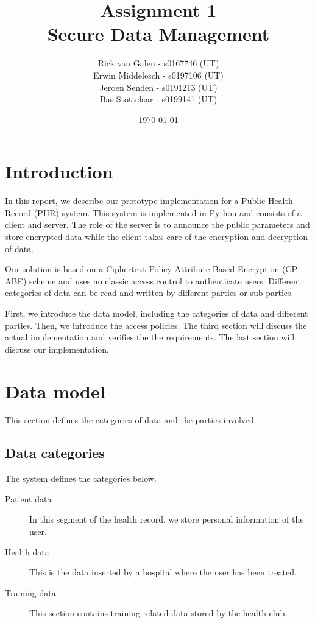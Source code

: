 \documentclass[a4paper]{article}
\begin{document}
\title{Assignment 1 \\ Secure Data Management}
\author{Rick van Galen - s0167746 (UT) \\ Erwin Middelesch - s0197106 (UT) \\ Jeroen Senden - s0191213 (UT) \\ Bas Stottelaar - s0199141 (UT)}
\date{\today}
\maketitle

\section{Introduction}
	In this report, we describe our prototype implementation for a Public Health Record (PHR) system. This system is implemented in Python and consists of a client and server. The role of the server is to announce the public parameters and store encrypted data while the client takes care of the encryption and decryption of data.

	Our solution is based on a Ciphertext-Policy Attribute-Based Encryption (CP-ABE) scheme and uses no classic access control to authenticate users. Different categories of data can be read and written by different parties or sub parties.
	
	First, we introduce the data model, including the categories of data and different parties. Then, we introduce the access policies. The third section will discuss the actual implementation and verifies the the requirements. The last section will discuss our implementation.

\section{Data model}
	This section defines the categories of data and the parties involved.

	\subsection{Data categories}
		The system defines the categories below. 
		
		\begin{description}
		    \item[Patient data]
		    In this segment of the health record, we store personal information of the user. 
		    \item[Health data]
		    This is the data inserted by a hospital where the user has been treated.
		    \item[Training data]
		    This section contains training related data stored by the health club.
		\end{description}
		
\end{document}
